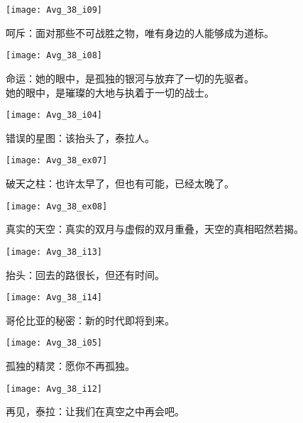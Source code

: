 \documentclass[openany]{book}
\begin{document}
\begin{figure}[h]
    \caption*{呵斥：面对那些不可战胜之物，唯有身边的人能够成为道标。}
    \centering
    \texttt{[image: Avg\_38\_i09]}
\end{figure}

\begin{figure}[h]
    \caption*{命运：她的眼中，是孤独的银河与放弃了一切的先驱者。\\她的眼中，是璀璨的大地与执着于一切的战士。}
    \centering
    \texttt{[image: Avg\_38\_i08]}
\end{figure}

\begin{figure}[h]
    \caption*{错误的星图：该抬头了，泰拉人。}
    \centering
    \texttt{[image: Avg\_38\_i04]}
\end{figure}

\begin{figure}[h]
    \caption*{破天之柱：也许太早了，但也有可能，已经太晚了。}
    \centering
    \texttt{[image: Avg\_38\_ex07]}
\end{figure}

\begin{figure}[h]
    \caption*{真实的天空：真实的双月与虚假的双月重叠，天空的真相昭然若揭。}
    \centering
    \texttt{[image: Avg\_38\_ex08]}
\end{figure}

\begin{figure}[h]
    \caption*{抬头：回去的路很长，但还有时间。}
    \centering
    \texttt{[image: Avg\_38\_i13]}
\end{figure}

\begin{figure}[h]
    \caption*{哥伦比亚的秘密：新的时代即将到来。}
    \centering
    \texttt{[image: Avg\_38\_i14]}
\end{figure}

\begin{figure}[h]
    \caption*{孤独的精灵：愿你不再孤独。}
    \centering
    \texttt{[image: Avg\_38\_i05]}
\end{figure}

\begin{figure}[h]
    \caption*{再见，泰拉：让我们在真空之中再会吧。}
    \centering
    \texttt{[image: Avg\_38\_i12]}
\end{figure}
\end{document}
